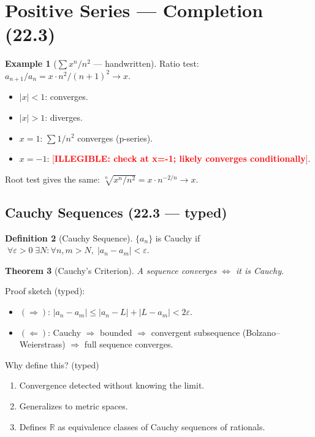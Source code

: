 \documentclass[12pt, a4paper]{article}
\newcommand{\illegible}[1][?]{\textcolor{red}{[\textbf{ILLEGIBLE: #1}]}}
\newtheorem{theorem}{Theorem}[section]
\theoremstyle{definition}
\newtheorem{definition}[theorem]{Definition}
\newtheorem{example}[theorem]{Example}
\theoremstyle{remark}
\begin{document}
\section{Positive Series --- Completion (22.3)}

\begin{example}[$\sum x^n/n^2$ --- handwritten]
Ratio test: $a_{n+1}/a_n = x \cdot n^2/(n+1)^2 \to x$.
\begin{itemize}
  \item $|x| < 1$: converges.
  \item $|x| > 1$: diverges.
  \item $x = 1$: $\sum 1/n^2$ converges (p-series).
  \item $x = -1$: \illegible[check at x=-1; likely converges conditionally].
\end{itemize}
Root test gives the same: $\sqrt[n]{x^n/n^2} = x \cdot n^{-2/n} \to x$.
\end{example}

\subsection{Cauchy Sequences (22.3 --- typed)}

\begin{definition}[Cauchy Sequence]
$\{a_n\}$ is Cauchy if $\;\forall \varepsilon > 0 \;\exists N : \forall n,m > N,\; |a_n - a_m| < \varepsilon$.
\end{definition}

\begin{theorem}[Cauchy's Criterion]
A sequence converges $\iff$ it is Cauchy.
\end{theorem}

Proof sketch (typed):
\begin{itemize}
  \item $(\Rightarrow)$: $|a_n - a_m| \leq |a_n - L| + |L - a_m| < 2\varepsilon$.
  \item $(\Leftarrow)$: Cauchy $\Rightarrow$ bounded $\Rightarrow$ convergent subsequence (Bolzano--Weierstrass) $\Rightarrow$ full sequence converges.
\end{itemize}

Why define this? (typed)
\begin{enumerate}
  \item Convergence detected without knowing the limit.
  \item Generalizes to metric spaces.
  \item Defines $\mathbb{R}$ as equivalence classes of Cauchy sequences of rationals.
\end{enumerate}
\end{document}
